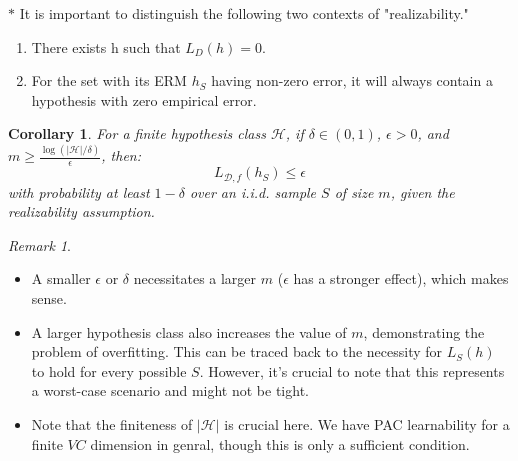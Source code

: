 \documentclass{article}
\newtheorem{corollary}[theorem]{Corollary}
\theoremstyle{remark}
\newtheorem{remark}[example]{Remark}
\begin{document}
$\ast$ It is important to distinguish the following two contexts of "realizability."
\begin{enumerate}
\item There exists h such that $L_D(h)=0$.
\item For the set with its ERM $h_S$ having non-zero error, it will always contain a hypothesis with zero empirical error.
\end{enumerate}

\begin{corollary}
For a finite hypothesis class $\mathcal{H}$, if $\delta\in (0,1)$, $\epsilon > 0$, and $m \geq \frac{\log(\lvert\mathcal{H}\rvert/\delta)}{\epsilon}$, then:
\[L_{\mathcal{D}, f}(h_S) \leq \epsilon\]
with probability at least $1-\delta$ over an i.i.d. sample $S$ of size $m$, given the realizability assumption.
\end{corollary}

\begin{remark}
\begin{itemize}
\item A smaller $\epsilon$ or $\delta$ necessitates a larger $m$ ($\epsilon$ has a stronger effect), which makes sense.
\item A larger hypothesis class also increases the value of $m$, demonstrating the problem of overfitting. This can be traced back to the necessity for $L_S(h)$ to hold for every possible $S$. However, it's crucial to note that this represents a worst-case scenario and might not be tight.
\item Note that the finiteness of $\lvert \mathcal{H}\rvert$ is crucial here. We have PAC learnability for a finite $VC$ dimension in genral, though this is only a sufficient condition.
\end{itemize}
\end{remark}
\end{document}
